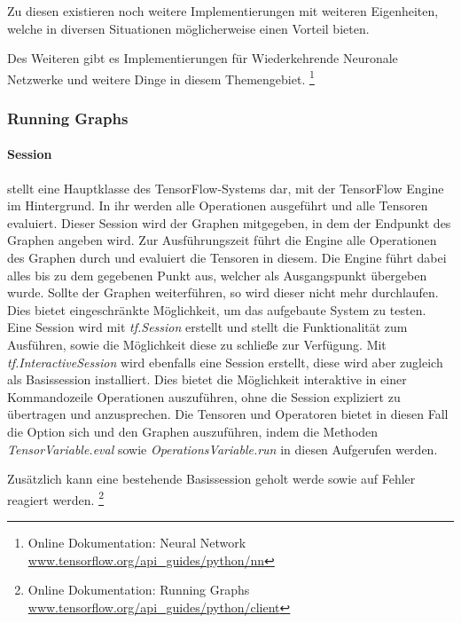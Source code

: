 \noindent
Zu diesen existieren noch weitere Implementierungen mit weiteren Eigenheiten, welche in diversen Situationen möglicherweise einen Vorteil bieten. 


\noindent
Des Weiteren gibt es Implementierungen für Wiederkehrende Neuronale Netzwerke und weitere Dinge in diesem Themengebiet. 
\footnote{Online Dokumentation: Neural Network \url{www.tensorflow.org/api_guides/python/nn}}

\subsubsection{Running Graphs}

\paragraph{Session} stellt eine Hauptklasse des TensorFlow-Systems dar, mit der TensorFlow Engine im Hintergrund.
In ihr werden alle Operationen ausgeführt und alle Tensoren evaluiert. 
Dieser Session wird der Graphen mitgegeben, in dem der Endpunkt des Graphen angeben wird. 
Zur Ausführungszeit führt die Engine alle Operationen des Graphen durch und evaluiert die Tensoren in diesem. 
Die Engine führt dabei alles bis zu dem gegebenen Punkt aus, welcher als Ausgangspunkt übergeben wurde. 
Sollte der Graphen weiterführen, so wird dieser nicht mehr durchlaufen. 
Dies bietet eingeschränkte Möglichkeit, um das aufgebaute System zu testen. 
Eine Session wird mit \textit{tf.Session} erstellt und stellt die Funktionalität zum Ausführen, sowie die Möglichkeit diese zu schließe zur Verfügung. 
Mit \textit{tf.InteractiveSession} wird ebenfalls eine Session erstellt, diese wird aber zugleich als Basissession installiert. 
Dies bietet die Möglichkeit interaktive in einer Kommandozeile Operationen auszuführen, ohne die Session expliziert zu übertragen und anzusprechen. 
Die Tensoren und Operatoren bietet in diesen Fall die Option sich und den Graphen auszuführen, indem die Methoden \textit{TensorVariable.eval} sowie \textit{OperationsVariable.run} in diesen Aufgerufen werden. 

\noindent
Zusätzlich kann eine bestehende Basissession geholt werde sowie auf Fehler reagiert werden. 
\footnote{Online Dokumentation: Running Graphs \url{www.tensorflow.org/api_guides/python/client}}

